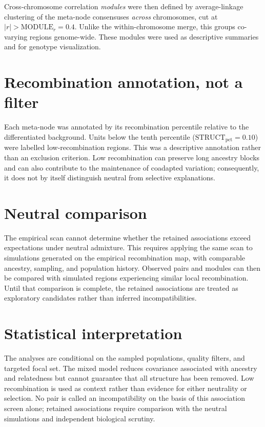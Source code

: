 \documentclass[11pt]{article}
\begin{document}
Cross-chromosome correlation \emph{modules} were then defined by average-linkage clustering
of the meta-node consensuses \emph{across} chromosomes, cut at $|r|>\mathrm{MODULE}_r=0.4$.
Unlike the within-chromosome merge, this groups co-varying regions genome-wide. These modules
were used as descriptive summaries and for genotype visualization.

\section{Recombination annotation, not a filter}\label{sec:recomb}

Each meta-node was annotated by its recombination percentile relative to the differentiated
background. Units below the tenth percentile
($\mathrm{STRUCT}_{\mathrm{pct}}=0.10$) were labelled low-recombination regions. This was a
descriptive annotation rather than an exclusion criterion. Low recombination can preserve
long ancestry blocks and can also contribute to the maintenance of coadapted variation;
consequently, it does not by itself distinguish neutral from selective explanations.

\section{Neutral comparison}\label{sec:null}

The empirical scan cannot determine whether the retained associations exceed expectations
under neutral admixture. This requires applying the same scan to simulations generated on
the empirical recombination map, with comparable ancestry, sampling, and population history.
Observed pairs and modules can then be compared with simulated regions experiencing similar
local recombination. Until that comparison is complete, the retained associations are treated
as exploratory candidates rather than inferred incompatibilities.

\section{Statistical interpretation}\label{sec:interp}

The analyses are conditional on the sampled populations, quality filters, and targeted focal
set. The mixed model reduces covariance associated with ancestry and relatedness but cannot
guarantee that all structure has been removed. Low recombination is used as context rather
than evidence for either neutrality or selection. No pair is called an incompatibility on the
basis of this association screen alone; retained associations require comparison with the
neutral simulations and independent biological scrutiny.
\end{document}
